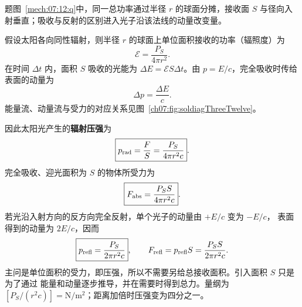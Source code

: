 {\begin{xesolution}题图~\ref{mech:07:12:q}中，同一总功率通过半径 $r$ 的球面分摊，接收面 $S$ 与径向入射垂直；吸收与反射的区别进入光子沿该法线的动量改变量。

假设太阳各向同性辐射，则半径 $r$ 的球面上单位面积接收的功率（辐照度）为
\[
 \mathcal E=\frac{P_S}{4\pi r^2}.
\]
在时间 $\Delta t$ 内，面积 $S$ 吸收的光能为 $\Delta E=\mathcal E S\Delta t$。由
$p=E/c$，完全吸收时传给表面的动量为
\[
 \Delta p=\frac{\Delta E}{c}.
\]
能量流、动量流与受力的对应关系见图~\ref{ch07:fig:soldiagThreeTwelve}。

\soldiagThreeTwelve
因此太阳光产生的\textbf{辐射压强}为
\[
 \boxed{p_{\rm rad}=\frac{F}{S}
 =\frac{P_S}{4\pi r^2c}}.
\]
完全吸收、迎光面积为 $S$ 的物体所受力为
\[
 \boxed{F_{\rm abs}=\frac{P_SS}{4\pi r^2c}}.
\]
若光沿入射方向的反方向完全反射，单个光子的动量由 $+E/c$ 变为 $-E/c$，
表面得到的动量为 $2E/c$，因而
\[
 \boxed{p_{\rm refl}=\frac{P_S}{2\pi r^2c}},\qquad
 F_{\rm refl}=p_{\rm refl}S=\frac{P_SS}{2\pi r^2c}.
\]
主问是单位面积的受力，即压强，所以不需要另给总接收面积。引入面积 $S$ 只是为了通过
能量和动量逐步推导，并在需要时得到总力。量纲为
$[P_S/(r^2c)]=\mathrm{N/m^2}$；距离加倍时压强变为四分之一。
\end{xesolution}
}

